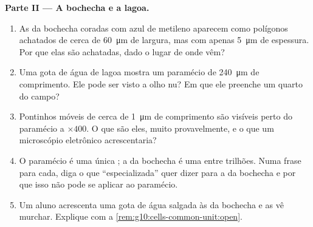 \begin{problem}
\medskip
\noindent\textbf{Parte II --- A bochecha e a lagoa.}
\begin{enumerate}[resume]
  \item As  da bochecha coradas com azul de metileno aparecem
        como polígonos achatados de cerca de \qty{60}{\micro m} de
        largura, mas com apenas \qty{5}{\micro m} de espessura. Por que
        elas são achatadas, dado o lugar de onde vêm?
  \item Uma gota de água de lagoa mostra um paramécio de
        \qty{240}{\micro m} de comprimento. Ele pode ser visto a olho
        nu? Em que  ele preenche um quarto do campo?
  \item Pontinhos móveis de cerca de \qty{1}{\micro m} de comprimento
        são visíveis perto do paramécio a $\times 400$. O que são eles,
        muito provavelmente, e o que um microscópio eletrônico
        acrescentaria?
  \item O paramécio é uma única ; a  da bochecha é uma
        entre trilhões. Numa frase para cada, diga o que
        ``especializada'' quer dizer para a  da bochecha e por
        que isso não pode se aplicar ao paramécio.
  \item Um aluno acrescenta uma gota de água salgada às  da
        bochecha e as vê murchar. Explique com a
        \cref{rem:g10:cells-common-unit:open}.
\end{enumerate}


\end{problem}
